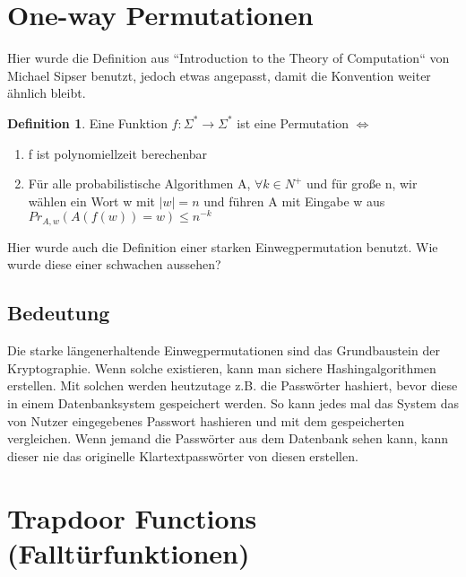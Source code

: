 \documentclass[12pt,a4paper]{article}
\theoremstyle{definition}
\newtheorem{definition}[theorem]{Definition}
\begin{document}
    \section{One-way Permutationen}

    Hier wurde die Definition aus ``Introduction to the Theory of Computation`` von Michael Sipser benutzt, jedoch
    etwas angepasst, damit die Konvention weiter ähnlich bleibt.

    \begin{definition}
        Eine Funktion $f: \Sigma^* \longrightarrow \Sigma^*$ ist eine Permutation $\Leftrightarrow$
        \begin{enumerate}
            \item f ist polynomiellzeit berechenbar
            \item Für alle probabilistische Algorithmen A, $\forall k \in N^+$ und für große n, wir wählen ein Wort w
            mit $|w| = n$ und führen A mit Eingabe w aus \\
            $Pr_{A, w}(A(f(w)) = w) \leq n^{-k}$
        \end{enumerate}
    \end{definition}

    Hier wurde auch die Definition einer starken Einwegpermutation benutzt. Wie wurde diese einer schwachen aussehen?

    \subsection{Bedeutung}
    Die starke längenerhaltende Einwegpermutationen sind das Grundbaustein der Kryptographie. Wenn solche existieren,
    kann man sichere Hashingalgorithmen erstellen. Mit solchen werden heutzutage z.B. die Passwörter hashiert, bevor
    diese in einem Datenbanksystem gespeichert werden. So kann jedes mal das System das von Nutzer eingegebenes Passwort
    hashieren und mit dem gespeicherten vergleichen. Wenn jemand die Passwörter aus dem Datenbank sehen kann, kann
    dieser nie das originelle Klartextpasswörter von diesen erstellen.

    \section{Trapdoor Functions (Falltürfunktionen)}
\end{document}

